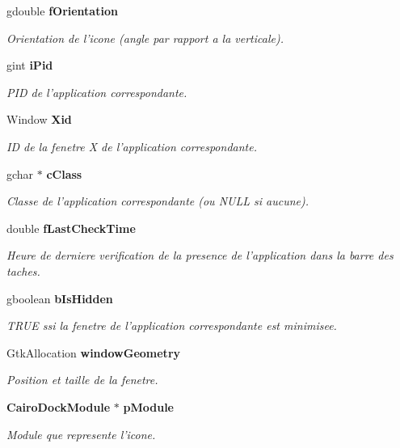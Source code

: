 \begin{CompactItemize}
gdouble {\bf fOrientation}
\begin{CompactList}\small\item\em Orientation de l'icone (angle par rapport a la verticale). \item\end{CompactList}\item 
gint {\bf iPid}
\begin{CompactList}\small\item\em PID de l'application correspondante. \item\end{CompactList}\item 
Window {\bf Xid}
\begin{CompactList}\small\item\em ID de la fenetre X de l'application correspondante. \item\end{CompactList}\item 
gchar $\ast$ {\bf cClass}
\begin{CompactList}\small\item\em Classe de l'application correspondante (ou NULL si aucune). \item\end{CompactList}\item 
double {\bf fLastCheckTime}
\begin{CompactList}\small\item\em Heure de derniere verification de la presence de l'application dans la barre des taches. \item\end{CompactList}\item 
gboolean {\bf bIsHidden}
\begin{CompactList}\small\item\em TRUE ssi la fenetre de l'application correspondante est minimisee. \item\end{CompactList}\item 
GtkAllocation {\bf windowGeometry}
\begin{CompactList}\small\item\em Position et taille de la fenetre. \item\end{CompactList}\item 
{\bf CairoDockModule} $\ast$ {\bf pModule}
\begin{CompactList}\small\item\em Module que represente l'icone. \item\end{CompactList}\item 

\end{CompactItemize}

